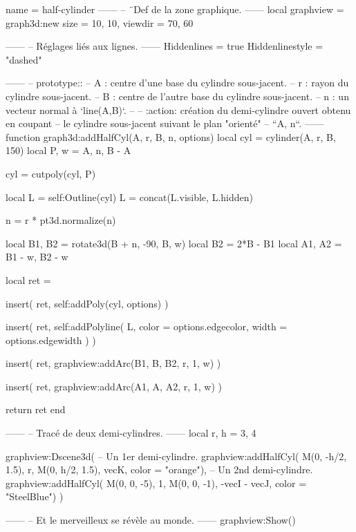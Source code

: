 \documentclass{standalone}
\begin{document}
\begin{luadraw}{name = half-cylinder}
------
-- ¨Def de la zone graphique.
------
local graphview = graph3d:new{
  size    = {10, 10},
  viewdir = {70, 60}
}

------
-- Réglages liés aux lignes.
------
Hiddenlines     = true
Hiddenlinestyle = "dashed"

------
-- prototype::
--     A : centre d'une base du cylindre sous-jacent.
--     r : rayon du cylindre sous-jacent.
--     B : centre de l'autre base du cylindre sous-jacent.
--     n : un vecteur normal à `line(A,B)`.
--
--     :action: création du demi-cylindre ouvert obtenu en coupant
--              le cylindre sous-jacent suivant le plan "orienté"
--              ``{A, n}``.
------
function graph3d:addHalfCyl(A, r, B, n, options)
  local cyl  = cylinder(A, r, B, 150)
  local P, w = {A, n}, B - A

  cyl = cutpoly(cyl, P)

  local L = self:Outline(cyl)
  L = concat(L.visible, L.hidden)

  n = r * pt3d.normalize(n)

  local B1, B2 = rotate3d(B + n, -90, {B, w})
  local B2     = 2*B - B1
  local A1, A2 = B1 - w, B2 - w

  local ret = {}

  insert(
    ret,
    self:addPoly(cyl, options)
  )

  insert(
    ret,
    self:addPolyline(
      L,
      {
        color = options.edgecolor,
        width = options.edgewidth
      })
  )

  insert(
    ret,
    graphview:addArc(B1, B, B2, r, 1, w)
  )

  insert(
    ret,
    graphview:addArc(A1, A, A2, r, 1, w)
  )

  return ret
end

------
-- Tracé de deux demi-cylindres.
------
local r, h = 3, 4

graphview:Dscene3d(
-- Un 1er demi-cylindre.
  graphview:addHalfCyl(
    M(0, -h/2, 1.5), r,
    M(0, h/2, 1.5), vecK,
    {color = "orange"}),
-- Un 2nd demi-cylindre.
  graphview:addHalfCyl(
    M(0, 0, -5), 1,
    M(0, 0, -1), -vecI - vecJ,
    {color = "SteelBlue"})
)

------
-- Et le merveilleux se révèle au monde.
------
graphview:Show()
\end{luadraw}
\end{document}
